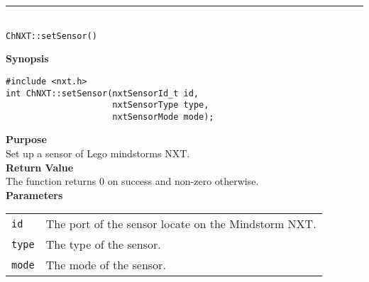 \noindent
\vspace{5pt}
\rule{4.5in}{0.015in}\\
\noindent
{\LARGE \texttt{ChNXT::setSensor()} }\\


\noindent
{\bf Synopsis}
\begin{lstlisting}
#include <nxt.h>
int ChNXT::setSensor(nxtSensorId_t id,
                     nxtSensorType type, 
                     nxtSensorMode mode);
\end{lstlisting}

\noindent
{\bf Purpose}\\
Set up a sensor of Lego mindstorms NXT.\\

\noindent
{\bf Return Value}\\
The function returns 0 on success and non-zero otherwise.\\

\noindent
{\bf Parameters}\\
\vspace{-0.1in}
\begin{description}
\item
\begin{tabular}{ p{20mm}p{135mm} }
\texttt{id}&The port of the sensor locate on the Mindstorm NXT.\\
\texttt{type}   &The type of the sensor. \\
\texttt{mode}   &The mode of the sensor. \\
\end{tabular}
\end{description}


